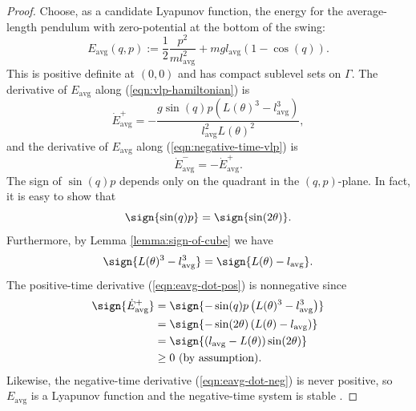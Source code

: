 \begin{proof}
   Choose, as a candidate Lyapunov function, the energy for the
   average-length pendulum with zero-potential at the bottom of the swing:
   \[
       E_\text{avg}(q,p) := \frac{1}{2}\frac{p^2}{m l_\text{avg}^2} 
           + m g l_\text{avg} (1-\cos(q))
      .
   \]
   This is positive definite at \((0,0)\) and has compact sublevel
   sets on \(\Gamma\). 
   The derivative of \(E_\text{avg}\) along (\ref{eqn:vlp-hamiltonian}) is
   \begin{equation}\label{eqn:eavg-dot-pos}
      \dot{E}_\text{avg}^+ = -\frac{g\sin(q)p \left(L(\theta)^3 - l_\text{avg}^3\right)}
              {l_\text{avg}^2L(\theta)^2}
      ,
   \end{equation}
   and the derivative of \(E_\text{avg}\) along (\ref{eqn:negative-time-vlp}) is
   \begin{equation}\label{eqn:eavg-dot-neg}
      \dot{E}_\text{avg}^- = - \dot{E}_\text{avg}^+
      .
   \end{equation}
   The sign of \(\sin(q)p\) depends only on the quadrant in the
   \((q,p)\)-plane. In fact, it is easy to show that
   \[
      \sign{\sin(q)p} = \sign{\sin(2\theta)}
      .
   \]
   Furthermore, by Lemma \ref{lemma:sign-of-cube} we have
   \[ 
       \sign{L(\theta)^3 - l_\text{avg}^3} = \sign{L(\theta) - l_\text{avg}}
       .
   \]
   The positive-time derivative (\ref{eqn:eavg-dot-pos}) is nonnegative since
   \begin{align}\label{eqn:vlp-proof-neg-inv}
    \sign{\dot{E}_\text{avg}^+} &= \sign{-\sin(q)p \left(L(\theta)^3 - l_\text{avg}^3\right)}
          \nonumber \\
          &= \sign{-\sin(2\theta) \left(L(\theta) - l_\text{avg}\right)}
          \nonumber \\
          &= \sign{(l_\text{avg} - L(\theta))\sin(2\theta)} 
          \nonumber \\
          &\geq 0 \text{ (by assumption)}
      .
   \end{align}
   Likewise, the negative-time derivative (\ref{eqn:eavg-dot-neg}) is never
   positive, so \(E_\text{avg}\) is a Lyapunov function and the negative-time system is
   stable \cite{lyapunov}. 


\end{proof}
